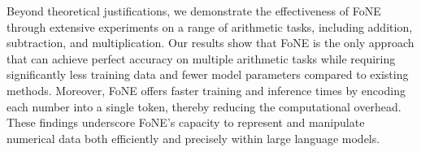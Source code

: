 Beyond theoretical justifications, we demonstrate the effectiveness of FoNE through extensive experiments on a range of arithmetic tasks, including addition, subtraction, and multiplication. Our results show that FoNE is the only approach that 
can achieve perfect accuracy on multiple arithmetic tasks while requiring significantly less training data and fewer model parameters compared to existing methods. Moreover, FoNE offers faster training and inference times by encoding each number into a single token, thereby reducing the computational overhead. These findings underscore FoNE’s capacity to represent and manipulate numerical data both efficiently and precisely within large language models.





